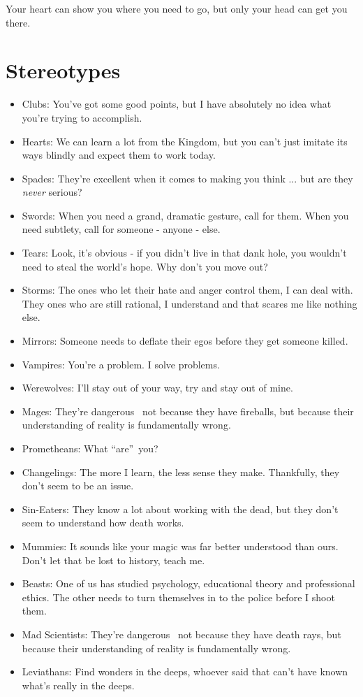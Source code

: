 Your heart can show you where you need to go, but only your head can get you there. 

\section*{Stereotypes}

\begin{itemize}
\item Clubs: You've got some good points, but I have absolutely no idea what you're trying to accomplish.
\item Hearts: We can learn a lot from the Kingdom, but you can't just imitate its ways blindly and expect them to work today.
\item Spades: They're excellent when it comes to making you think ... but are they \textit{never} serious?
\item Swords: When you need a grand, dramatic gesture, call for them. When you need subtlety, call for someone - anyone - else.
\item Tears: Look, it's obvious - if you didn't live in that dank hole, you wouldn't need to steal the world's hope. Why don't you move out?
\item Storms: The ones who let their hate and anger control them, I can deal with. They ones who are still rational, I understand and that scares me like nothing else.
\item Mirrors: Someone needs to deflate their egos before they get someone killed.

\item Vampires: You're a problem. I solve problems.
\item Werewolves: I'll stay out of your way, try and stay out of mine.
\item Mages: They're dangerous \textendash\, not because they have fireballs, but because their understanding of reality is fundamentally wrong.
\item Prometheans: What \textquotedblleft are\textquotedblright\, you?
\item Changelings: The more I learn, the less sense they make. Thankfully, they don't seem to be an issue.
\item Sin-Eaters: They know a lot about working with the dead, but they don't seem to understand how death works.
\item Mummies: It sounds like your magic was far better understood than ours. Don't let that be lost to history, teach me. 
\item Beasts: One of us has studied psychology, educational theory and professional ethics. The other needs to turn themselves in to the police before I shoot them.
\item Mad Scientists: They're dangerous \textendash\, not because they have death rays, but because their understanding of reality is fundamentally wrong.
\item Leviathans: Find wonders in the deeps, whoever said that can't have known what's really in the deeps.


\end{itemize}
